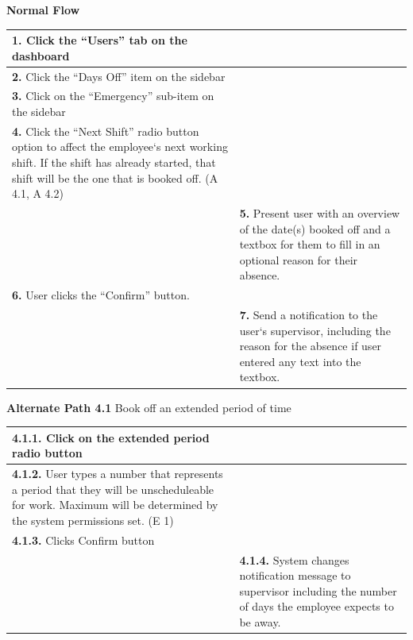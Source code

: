 \documentclass[letterpaper,12pt]{report}
\begin{document}
{ \centering \textbf{Normal Flow}
\begin{center}
\xuchead
\begin{tabular}{| p{8.5cm} | p{8.5cm} |}
\hline
\textbf{1.} Click the ``Users'' tab on the dashboard & \\
\hline
\textbf{2.} Click the ``Days Off'' item on the sidebar & \\
\hline
\textbf{3.} Click on the ``Emergency'' sub-item on the sidebar & \\
\hline
\textbf{4.} Click the ``Next Shift'' radio button option to affect the employee`s next working shift. If the shift has already started, that shift will be the one that is booked off. (A 4.1, A 4.2) & \\
\hline
& \textbf{5.} Present user with an overview of the date(s) booked off and a textbox for them to fill in an optional reason for their absence. \\
\hline
\textbf{6.} User clicks the ``Confirm'' button.& \\
\hline
& \textbf{7.} Send a notification to the user`s supervisor, including the reason for the absence if user entered any text into the textbox. \\
\hline

\end{tabular}
\end{center}


\pagebreak
\centering \textbf{Alternate Path 4.1}
\linebreak Book off an extended period of time
\begin{center}
\xuchead
\begin{tabular}{| p{8.5cm} | p{8.5cm} |}
\hline
\textbf{4.1.1.} Click on the extended period radio button  & \\
\hline
\textbf{4.1.2.} User types a number that represents a period that they will be unscheduleable for work. Maximum will be determined by the system\index{system} permissions set. (E 1) & \\
\hline
\textbf{4.1.3.} Clicks Confirm button & \\
\hline
& \textbf{4.1.4.} System\index{system} changes notification message to supervisor including the number of days the employee expects to be away. \\
\hline
\end{tabular}
\end{center}

}
\end{document}
